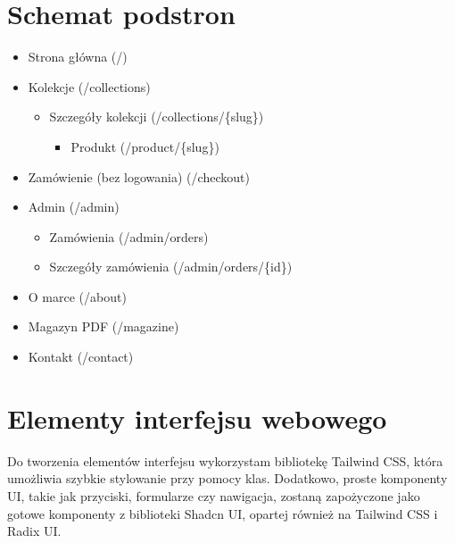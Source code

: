 \documentclass[14pt]{extarticle}
\begin{document}
	\section{Schemat podstron}
		\begin{itemize}
			\item Strona główna (/)
			\item Kolekcje (/collections)
			\begin{itemize}
				\item Szczegóły kolekcji (/collections/\{slug\})
				\begin{itemize}
					\item Produkt (/product/\{slug\})
				\end{itemize}
			\end{itemize}
			\item Zamówienie (bez logowania) (/checkout)
			\item Admin (/admin)
			\begin{itemize}
				\item Zamówienia (/admin/orders)
				\item Szczegóły zamówienia (/admin/orders/\{id\})
			\end{itemize}
			\item O marce (/about)
			\item Magazyn PDF (/magazine)
			\item Kontakt (/contact)
		\end{itemize}
	
	\section{Elementy interfejsu webowego}
		Do tworzenia elementów interfejsu wykorzystam bibliotekę Tailwind CSS, która umożliwia szybkie stylowanie przy pomocy klas.
		Dodatkowo, proste komponenty UI, takie jak przyciski, formularze czy nawigacja, zostaną zapożyczone jako gotowe komponenty z biblioteki Shadcn UI, opartej również na Tailwind CSS i Radix UI.
		
\end{document}

